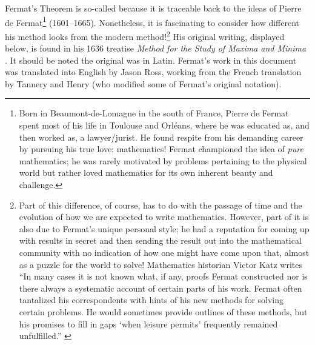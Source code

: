 \documentclass[11pt]{article}
\begin{document}
Fermat's Theorem is so-called because it is traceable back to the ideas of Pierre de Fermat\footnote{Born in Beaumont-de-Lomagne in the south of France, Pierre de Fermat spent most of his life in Toulouse and Orl\'{e}ans, where he was educated as, and then worked as, a lawyer/jurist.  He found respite from his demanding career by pursuing his true love: mathematics!  Fermat championed the idea of \emph{pure} mathematics; he was rarely motivated by problems pertaining to the physical world but rather loved mathematics for its own inherent beauty and challenge.} (1601--1665).  Nonetheless, it is fascinating to consider how different his method looks from the modern method!\footnote{Part of this difference, of course, has to do with the passage of time and the evolution of how we are expected to write mathematics.  However, part of it is also due to Fermat's unique personal style; he had a reputation for coming up with results in secret and then sending the result out into the mathematical community with no indication of how one might have come upon that, almost as a puzzle for the world to solve!  Mathematics historian Victor Katz writes ``In many cases it is not known what, if any, proofs Fermat constructed nor is there always a systematic account of certain parts of his work.  Fermat often tantalized his correspondents with hints of his new methods for solving certain problems.  He would sometimes provide outlines of these methods, but his promises to fill in gaps `{\sf when leisure permits}' frequently remained unfulfilled.'' \citep[page 433]{Katz}}  His original writing, displayed below, is found in his 1636 treatise \emph{Method for the Study of Maxima and Minima} \citep{FermatMaxMin}.  It should be noted the original was in Latin. Fermat's work in this document was translated into English by Jason Ross, working from the French translation by Tannery and Henry \citep{Tannery} (who modified some of Fermat's original notation).
\end{document}
